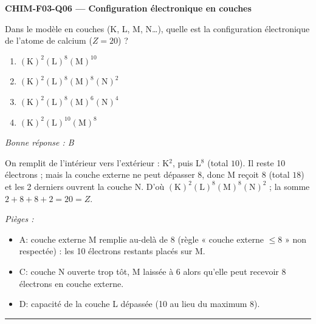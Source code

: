 \documentclass[11pt,a4paper]{article}
\begin{document}
\noindent\textbf{CHIM-F03-Q06 --- Configuration électronique en couches}\par
Dans le modèle en couches (K, L, M, N\dots), quelle est la configuration électronique de l'atome de calcium ($Z=20$) ?
\begin{enumerate}[label=\Alph*)]
\item $(\mathrm{K})^2(\mathrm{L})^8(\mathrm{M})^{10}$
\item $(\mathrm{K})^2(\mathrm{L})^8(\mathrm{M})^8(\mathrm{N})^2$
\item $(\mathrm{K})^2(\mathrm{L})^8(\mathrm{M})^6(\mathrm{N})^4$
\item $(\mathrm{K})^2(\mathrm{L})^{10}(\mathrm{M})^8$
\end{enumerate}
\textit{Bonne réponse : B}\par
On remplit de l'intérieur vers l'extérieur : K$^2$, puis L$^8$ (total $10$). Il reste \num{10} électrons ; mais la couche externe ne peut dépasser \num{8}, donc M reçoit $8$ (total $18$) et les \num{2} derniers ouvrent la couche N. D'où $(\mathrm{K})^2(\mathrm{L})^8(\mathrm{M})^8(\mathrm{N})^2$ ; la somme $2+8+8+2 = 20 = Z$.\par
\textit{Pièges :}
\begin{itemize}
\item A: couche externe M remplie au-delà de \num{8} (règle « couche externe $\le 8$ » non respectée) : les \num{10} électrons restants placés sur M.
\item C: couche N ouverte trop tôt, M laissée à \num{6} alors qu'elle peut recevoir \num{8} électrons en couche externe.
\item D: capacité de la couche L dépassée (\num{10} au lieu du maximum \num{8}).
\end{itemize}
\vspace{8pt}\hrule\vspace{8pt}
\end{document}
